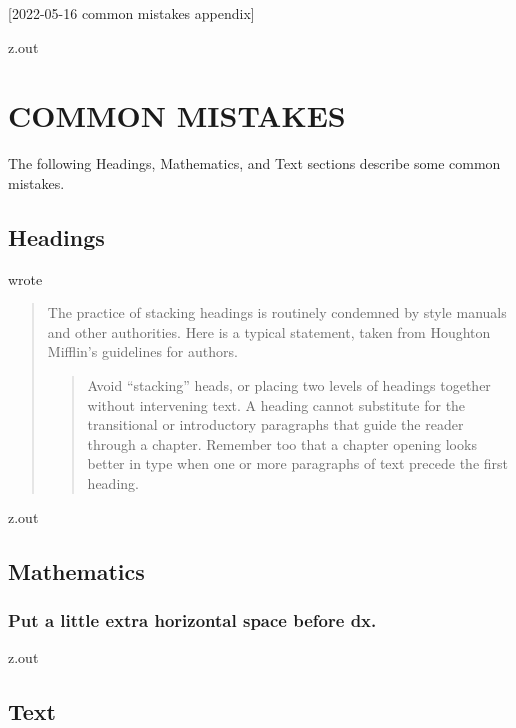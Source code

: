 [2022-05-16 common mistakes appendix]

\begin{VerbatimOut}{z.out}
\chapter{COMMON MISTAKES}

The following Headings, Mathematics, and Text
sections describe some common mistakes.


\section{Headings}

\textcite[page~289]{farkas2011}
wrote

\begin{quotation}
  The practice of stacking headings
  is routinely condemned by style manuals
  and other authorities.
  Here is a typical statement,
  taken from Houghton Mifflin's guidelines for authors.
  \begin{quotation}
    Avoid ``stacking'' heads,
    or placing two levels
    of headings together without intervening text.
    A heading cannot substitute
    for the transitional
    or introductory paragraphs
    that guide the reader through a chapter.
    Remember too that a chapter opening looks better in type
    when one
    or more paragraphs
    of text precede the first heading.
  \end{quotation}
\end{quotation}
\end{VerbatimOut}

\MyIO

\begin{VerbatimOut}{z.out}


\section{Mathematics}

\subsection{Put a little extra horizontal space before dx.}
\end{VerbatimOut}
\MyIO


\begin{VerbatimOut}{z.out}


\section{Text}
\end{VerbatimOut}

